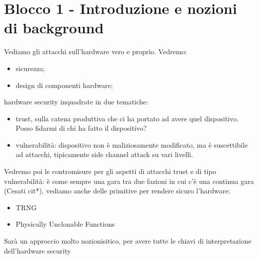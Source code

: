 \documentclass[oneside, 12pt]{extbook}
\begin{document}
\chapter{Blocco 1 - Introduzione e nozioni di background}
Vediamo gli attacchi sull'hardware vero e proprio. Vedremo:
\begin{itemize}
	\item sicurezza;
	\item design di componenti hardware;
\end{itemize}
hardware security inquadrate in due tematiche:
\begin{itemize}
	\item trust, sulla catena produttiva che ci ha portato ad avere quel dispositivo. Posso fidarmi di chi ha fatto il dispositivo?
	\item vulnerabilità: dispositivo non è maliziosamente modificato, ma è suscettibile ad attacchi, tipicamente side channel attack su vari livelli.
\end{itemize}
Vedremo poi le contromisure per gli aspetti di attacchi trust e di tipo vulnerabilità: è come sempre una gara tra due fazioni in cui c'è una continua gara (Cesati cit*), vediamo anche delle primitive per rendere sicuro l'hardware:
\begin{itemize}
	\item TRNG
	\item Physically Unclonable Functions
\end{itemize}
Sarà un approccio molto nozionisitico, per avere tutte le chiavi di interpretazione dell'hardware security
\end{document}
